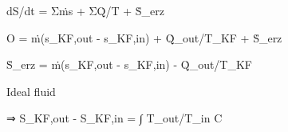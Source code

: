 dS/dt = Σṁs + ΣQ̇/T + Ṡ_erz  

O = ṁ(s_KF,out - s_KF,in) + Q̇_out/T_KF + Ṡ_erz  

Ṡ_erz = ṁ(s_KF,out - s_KF,in) - Q̇_out/T_KF  

Ideal fluid  

⇒ S_KF,out - S_KF,in = ∫ T_out/T_in C